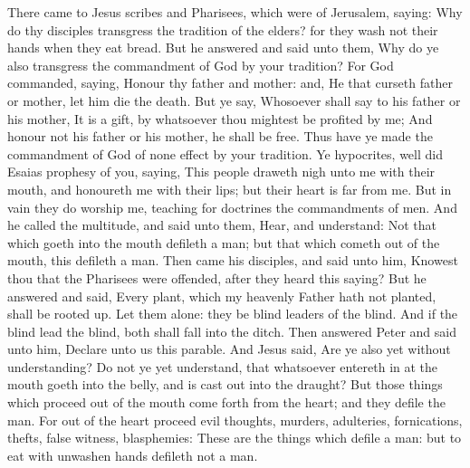 
 There came to Jesus scribes and Pharisees, which were of Jerusalem, saying: Why do thy disciples transgress the tradition of the elders? for they wash not their hands when they eat bread. But he answered and said unto them, Why do ye also transgress the commandment of God by your tradition? For God commanded, saying, Honour thy father and mother: and, He that curseth father or mother, let him die the death. But ye say, Whosoever shall say to his father or his mother, It is a gift, by whatsoever thou mightest be profited by me; And honour not his father or his mother, he shall be free. Thus have ye made the commandment of God of none effect by your tradition. Ye hypocrites, well did Esaias prophesy of you, saying, This people draweth nigh unto me with their mouth, and honoureth me with their lips; but their heart is far from me. But in vain they do worship me, teaching for doctrines the commandments of men. And he called the multitude, and said unto them, Hear, and understand: Not that which goeth into the mouth defileth a man; but that which cometh out of the mouth, this defileth a man. Then came his disciples, and said unto him, Knowest thou that the Pharisees were offended, after they heard this saying? But he answered and said, Every plant, which my heavenly Father hath not planted, shall be rooted up. Let them alone: they be blind leaders of the blind. And if the blind lead the blind, both shall fall into the ditch. Then answered Peter and said unto him, Declare unto us this parable. And Jesus said, Are ye also yet without understanding? Do not ye yet understand, that whatsoever entereth in at the mouth goeth into the belly, and is cast out into the draught? But those things which proceed out of the mouth come forth from the heart; and they defile the man. For out of the heart proceed evil thoughts, murders, adulteries, fornications, thefts, false witness, blasphemies: These are the things which defile a man: but to eat with unwashen hands defileth not a man.

